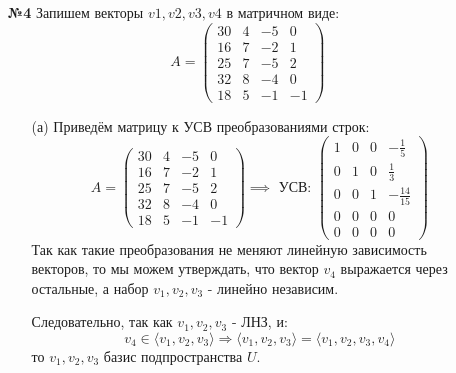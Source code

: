 \documentclass[a4paper]{article}
\renewcommand{\r}{\Rightarrow}
\begin{document}
\begin{enumerate}
    \item[\textbf{№4}]
    Запишем векторы $v1, v2, v3, v4$ в матричном виде:
    $$
   A = \begin{pmatrix}
   30 & 4 & -5 & 0 \\
   16 & 7 & -2 & 1 \\
   25 & 7 & -5 & 2 \\
   32 & 8 & -4 & 0 \\
   18 & 5 & -1 & -1
   \end{pmatrix}
   $$
   \begin{enumerate}
    \item[(а)]
    Приведём матрицу к УСВ преобразованиями строк:
    $$A = \begin{pmatrix}
     30 & 4 & -5 & 0 \\
     16 & 7 & -2 & 1 \\
     25 & 7 & -5 & 2 \\
     32 & 8 & -4 & 0 \\
     18 & 5 & -1 & -1
    \end{pmatrix} \implies \text{ УСВ: } \begin{pmatrix}
        1 & 0 & 0 & -\frac{1}{5} \\
        0 & 1 & 0 & \frac{1}{3} \\
        0 & 0 & 1 & -\frac{14}{15} \\
        0 & 0 & 0 & 0 \\
        0 & 0 & 0 & 0
        \end{pmatrix}$$
    Так как такие преобразования не меняют линейную зависимость векторов, то мы можем утверждать, что вектор $v_4$ выражается через остальные, а набор $v_1, v_2, v_3$ - линейно независим.

    Следовательно, так как $v_1, v_2, v_3$ - ЛНЗ, и: 
    $$v_4 \in \langle v_1, v_2, v_3 \rangle \r \langle v_1, v_2, v_3 \rangle = \langle v_1, v_2, v_3, v_4 \rangle$$
    то $v_1, v_2, v_3$ базис подпространства $U$.


\end{enumerate}
\end{enumerate}
\end{document}
